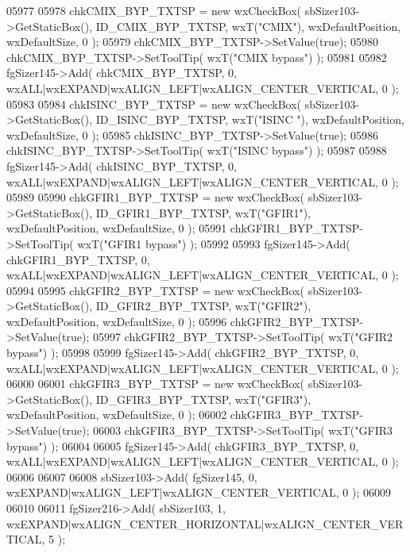 \begin{DoxyCode}
05977     
05978     chkCMIX_BYP_TXTSP = \textcolor{keyword}{new} wxCheckBox( sbSizer103->GetStaticBox(), 
      ID_CMIX_BYP_TXTSP, wxT(\textcolor{stringliteral}{"CMIX"}), wxDefaultPosition, wxDefaultSize, 0 );
05979     chkCMIX_BYP_TXTSP->SetValue(\textcolor{keyword}{true}); 
05980     chkCMIX_BYP_TXTSP->SetToolTip( wxT(\textcolor{stringliteral}{"CMIX bypass"}) );
05981     
05982     fgSizer145->Add( chkCMIX_BYP_TXTSP, 0, wxALL|wxEXPAND|wxALIGN\_LEFT|wxALIGN\_CENTER\_VERTICAL, 0 );
05983     
05984     chkISINC_BYP_TXTSP = \textcolor{keyword}{new} wxCheckBox( sbSizer103->GetStaticBox(), 
      ID_ISINC_BYP_TXTSP, wxT(\textcolor{stringliteral}{"ISINC "}), wxDefaultPosition, wxDefaultSize, 0 );
05985     chkISINC_BYP_TXTSP->SetValue(\textcolor{keyword}{true}); 
05986     chkISINC_BYP_TXTSP->SetToolTip( wxT(\textcolor{stringliteral}{"ISINC bypass"}) );
05987     
05988     fgSizer145->Add( chkISINC_BYP_TXTSP, 0, wxALL|wxEXPAND|wxALIGN\_LEFT|wxALIGN\_CENTER\_VERTICAL, 0 );
05989     
05990     chkGFIR1_BYP_TXTSP = \textcolor{keyword}{new} wxCheckBox( sbSizer103->GetStaticBox(), 
      ID_GFIR1_BYP_TXTSP, wxT(\textcolor{stringliteral}{"GFIR1"}), wxDefaultPosition, wxDefaultSize, 0 );
05991     chkGFIR1_BYP_TXTSP->SetToolTip( wxT(\textcolor{stringliteral}{"GFIR1 bypass"}) );
05992     
05993     fgSizer145->Add( chkGFIR1_BYP_TXTSP, 0, wxALL|wxEXPAND|wxALIGN\_LEFT|wxALIGN\_CENTER\_VERTICAL, 0 );
05994     
05995     chkGFIR2_BYP_TXTSP = \textcolor{keyword}{new} wxCheckBox( sbSizer103->GetStaticBox(), 
      ID_GFIR2_BYP_TXTSP, wxT(\textcolor{stringliteral}{"GFIR2"}), wxDefaultPosition, wxDefaultSize, 0 );
05996     chkGFIR2_BYP_TXTSP->SetValue(\textcolor{keyword}{true}); 
05997     chkGFIR2_BYP_TXTSP->SetToolTip( wxT(\textcolor{stringliteral}{"GFIR2 bypass"}) );
05998     
05999     fgSizer145->Add( chkGFIR2_BYP_TXTSP, 0, wxALL|wxEXPAND|wxALIGN\_LEFT|wxALIGN\_CENTER\_VERTICAL, 0 );
06000     
06001     chkGFIR3_BYP_TXTSP = \textcolor{keyword}{new} wxCheckBox( sbSizer103->GetStaticBox(), 
      ID_GFIR3_BYP_TXTSP, wxT(\textcolor{stringliteral}{"GFIR3"}), wxDefaultPosition, wxDefaultSize, 0 );
06002     chkGFIR3_BYP_TXTSP->SetValue(\textcolor{keyword}{true}); 
06003     chkGFIR3_BYP_TXTSP->SetToolTip( wxT(\textcolor{stringliteral}{"GFIR3 bypass"}) );
06004     
06005     fgSizer145->Add( chkGFIR3_BYP_TXTSP, 0, wxALL|wxEXPAND|wxALIGN\_LEFT|wxALIGN\_CENTER\_VERTICAL, 0 );
06006     
06007     
06008     sbSizer103->Add( fgSizer145, 0, wxEXPAND|wxALIGN\_LEFT|wxALIGN\_CENTER\_VERTICAL, 0 );
06009     
06010     
06011     fgSizer216->Add( sbSizer103, 1, wxEXPAND|wxALIGN\_CENTER\_HORIZONTAL|wxALIGN\_CENTER\_VERTICAL, 5 );

\end{DoxyCode}
